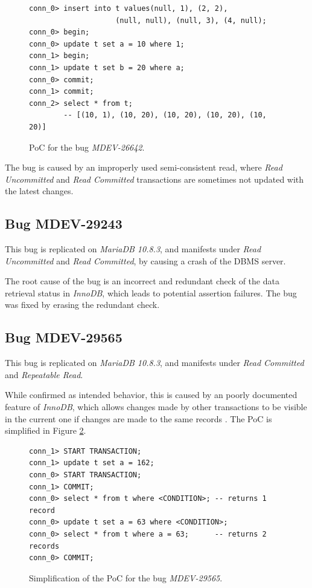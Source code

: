 \begin{figure}
\begin{verbatim}
conn_0> insert into t values(null, 1), (2, 2),
                    (null, null), (null, 3), (4, null);
conn_0> begin;
conn_0> update t set a = 10 where 1;
conn_1> begin;
conn_1> update t set b = 20 where a;
conn_0> commit;
conn_1> commit;
conn_2> select * from t; 
        -- [(10, 1), (10, 20), (10, 20), (10, 20), (10, 20)]
\end{verbatim}
\caption{PoC for the bug \textit{MDEV-26642}.} \label{fig:MDEV-26643}
\end{figure}

The bug is caused by an improperly used semi-consistent read, where \textit{Read Uncommitted} and \textit{Read Committed} transactions are sometimes not updated with the latest changes.

\subsection*{Bug MDEV-29243}

This bug is replicated on \textit{MariaDB 10.8.3}, and manifests under \textit{Read Uncommitted} and \textit{Read Committed}, by causing a crash of the DBMS server.

The root cause of the bug is an incorrect and redundant check of the data retrieval status in \textit{InnoDB}, which leads to potential assertion failures. The bug was fixed by erasing the redundant check.

\subsection*{Bug MDEV-29565}

This bug is replicated on \textit{MariaDB 10.8.3}, and manifests under \textit{Read Committed} and \textit{Repeatable Read}.

While confirmed as intended behavior, this is caused by an poorly documented feature of \textit{InnoDB}, which allows changes made by other transactions to be visible in the current one if changes are made to the same records \cite{mysqlconsistentread}. The PoC is simplified in Figure \ref{fig:MDEV-29565}.

\begin{figure}
\begin{verbatim}
conn_1> START TRANSACTION;
conn_1> update t set a = 162;
conn_0> START TRANSACTION;
conn_1> COMMIT;
conn_0> select * from t where <CONDITION>; -- returns 1 record
conn_0> update t set a = 63 where <CONDITION>;
conn_0> select * from t where a = 63;      -- returns 2 records
conn_0> COMMIT;
\end{verbatim}
\caption{Simplification of the PoC for the bug \textit{MDEV-29565}.} \label{fig:MDEV-29565}
\end{figure}


